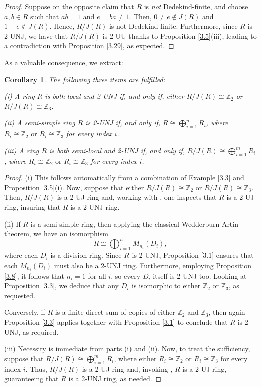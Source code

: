 \documentclass[12pt]{amsart}
\newtheorem{corollary}[theorem]{Corollary}
\theoremstyle{definition}
\begin{document}
\begin{proof}
Suppose on the opposite claim that \( R \) is {\it not} Dedekind-finite, and choose \( a, b \in R \) such that \( ab = 1 \) and \( e = ba \neq 1 \). Then, \( 0 \neq e \notin J(R) \) and \( 1 - e \notin J(R) \). Hence, \( R/J(R) \) is not Dedekind-finite. Furthermore, since \( R \) is 2-UNJ, we have that \( R/J(R) \) is 2-UU thanks to Proposition \ref{3.5}(iii), leading to a contradiction with Proposition \ref{3.29}, as expected.
\end{proof}

As a valuable consequence, we extract:

\begin{corollary}\label{3.26} The following three items are fulfilled:

(i) A ring \( R \) is both local and 2-UNJ if, and only if, either \( R/J(R) \cong \mathbb{Z}_2 \) or \(R/J(R) \cong  \mathbb{Z}_3 \).

(ii) A semi-simple ring $R$ is 2-UNJ if, and only if, $R \cong \bigoplus_{i=1}^n R_i$, where $R_i\cong \mathbb{Z}_2 \text{ or } R_i\cong \mathbb{Z}_3$ for every index $i$.

(iii) A ring \( R \) is both semi-local and 2-UNJ if, and only if, $R/J(R) \cong \bigoplus_{i=1}^m R_i$, where $R_i \cong \mathbb{Z}_2 \text{ or } R_i\cong \mathbb{Z}_3$ for every index $i$.
\end{corollary}

\begin{proof}
(i) This follows automatically from a combination of Example \ref{3.3} and Proposition \ref{3.5}(i). Now, suppose that either $R/J(R) \cong \mathbb{Z}_2$ or $R/J(R) \cong \mathbb{Z}_3$. Then, $R/J(R)$ is a 2-UJ ring and, working with \cite[Lemma 2.5]{1}, one inspects that $R$ is a 2-UJ ring, insuring that $R$ is a 2-UNJ ring.

(ii) If $R$ is a semi-simple ring, then applying the classical Wedderburn-Artin theorem, we have an isomorphism $$R \cong \bigoplus_{i=1}^n M_{n_i}(D_i),$$ where each $D_i$ is a division ring. Since $R$ is 2-UNJ, Proposition \ref{3.1} ensures that each $M_{n_i}(D_i)$ must also be a 2-UNJ ring. Furthermore, employing Proposition \ref{3.8}, it follows that $n_i=1$ for all $i$, so every $D_i$ itself is 2-UNJ too. Looking at Proposition \ref{3.3}, we deduce that any $D_i$ is isomorphic to either $\mathbb{Z}_2$ or $\mathbb{Z}_3$, as requested.

Conversely, if $R$ is a finite direct sum of copies of either $\mathbb{Z}_2$ and $\mathbb{Z}_3$, then again Proposition \ref{3.3} applies together with Proposition \ref{3.1} to conclude that $R$ is 2-UNJ, as required.

(iii) Necessity is immediate from parts (i) and (ii). Now, to treat the sufficiency, suppose that $R/J(R) \cong \bigoplus_{i=1}^m R_i$, where either $R_i \cong \mathbb{Z}_2$ or $R_i \cong \mathbb{Z}_3$ for every index $i$. Thus, $R/J(R)$ is a 2-UJ ring and, invoking \cite[Lemma 2.5]{1}, $R$ is a 2-UJ ring, guaranteeing that $R$ is a 2-UNJ ring, as needed.
\end{proof}
\end{document}
